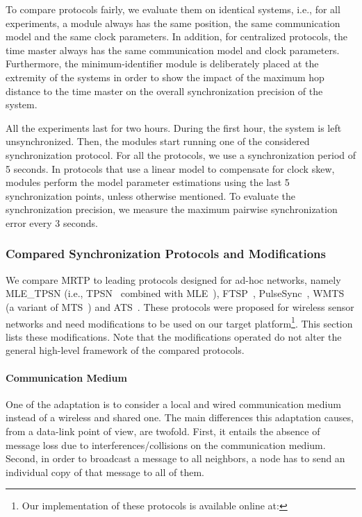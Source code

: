 To compare protocols fairly, we evaluate them on identical systems, i.e., for all experiments, a module always has the same position, the same communication model and the same clock parameters. In addition, for centralized protocols, the time master always has the same communication model and clock parameters. Furthermore, the minimum-identifier module is deliberately placed at the extremity of the systems in order to show the impact of the maximum hop distance to the time master on the overall synchronization precision of the system.

All the experiments last for two hours. During the first hour, the system is left unsynchronized. Then, the modules start running one of the considered synchronization protocol. For all the protocols, we use a synchronization period of 5 seconds. In protocols that use a linear model to compensate for clock skew, modules perform the model parameter estimations using the last 5 synchronization points, unless otherwise mentioned. To evaluate the synchronization precision, we measure the maximum pairwise synchronization error every 3 seconds. 

\subsubsection{Compared Synchronization Protocols and Modifications}
\label{section:time-sync:compared-protocols}

We compare MRTP to leading protocols designed for ad-hoc networks, namely MLE\_TPSN (i.e., TPSN~\cite{ganeriwal2003timing} combined with MLE~\cite{leng2010clock}), FTSP~\cite{maroti2004flooding}, PulseSync~\cite{lenzen2009optimal}, WMTS~\cite{he2014time} (a variant of MTS~\cite{he2014time}) and ATS~\cite{schenato2011average}. These protocols were proposed for wireless sensor networks and need modifications to be used on our target platform\footnote{Our implementation of these protocols is available online at: \VisibleSimUrl{}}. This section lists these modifications. Note that the modifications operated do not alter the general high-level framework of the compared protocols.

\paragraph{Communication Medium}

One of the adaptation is to consider a local and wired communication medium instead of a wireless and shared one. The main differences this adaptation causes, from a data-link point of view, are twofold. First, it entails the absence of message loss due to interferences/collisions on the communication medium. Second, in order to broadcast a message to all neighbors, a node has to send an individual copy of that message to all of them.

